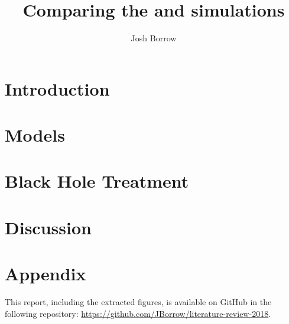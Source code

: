 \documentclass[a4paper]{article}
\author{Josh Borrow}
\title{Comparing the \hagn{} and \fire{} simulations}
\begin{document}
\maketitle

\section{Introduction}\label{sec:intro}


\section{Models}\label{sec:models}


\section{Black Hole Treatment}\label{sec:bhs}


\section{Discussion}\label{sec:discussion}


\section{Appendix}\label{sec:appendix}

This report, including the extracted figures, is available on GitHub in the
following repository: \url{https://github.com/JBorrow/literature-review-2018}.


\end{document}
